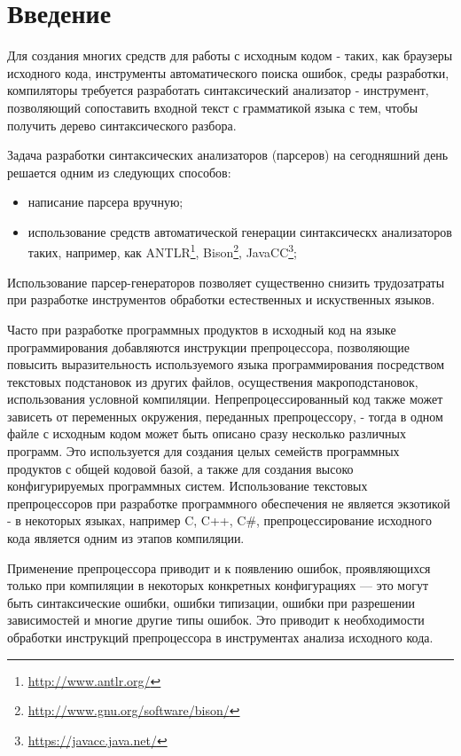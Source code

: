 \clearpage
\section{Введение}

Для создания многих средств для работы с исходным кодом - таких, как браузеры исходного кода, инструменты автоматического поиска ошибок, среды разработки, компиляторы требуется разработать синтаксический анализатор - инструмент, позволяющий сопоставить входной текст с грамматикой языка с тем, чтобы получить дерево синтаксического разбора\cite{aho}.

Задача разработки синтаксических анализаторов (парсеров) на сегодняшний день решается одним из следующих способов:
\begin{itemize}
	\item написание парсера вручную;
	\item использование средств автоматической генерации синтаксическх анализаторов таких, например, как ANTLR\footnote{\url{http://www.antlr.org/}}, Bison\footnote{\url{http://www.gnu.org/software/bison/}}, JavaCC\footnote{\url{https://javacc.java.net/}};
\end{itemize}
Использование парсер-генераторов позволяет существенно снизить трудозатраты при разработке инструментов обработки естественных и искуственных языков.

Часто при разработке программных продуктов в исходный код на языке программирования добавляются инструкции препроцессора, позволяющие повысить выразительность используемого языка программирования посредством текстовых подстановок из других файлов, осуществения макроподстановок, использования условной компиляции. Непрепроцессированный код также может зависеть от переменных окружения, переданных препроцессору, - тогда в одном файле с исходным кодом может быть описано сразу несколько различных программ. Это используется для создания целых семейств программных продуктов с общей кодовой базой\cite{flightsoftwareproductline}, а также для создания высоко конфигурируемых программных систем. Использование текстовых препроцессоров при разработке программного обеспечения не является экзотикой - в некоторых языках, например C, C++, C\#, препроцессирование исходного кода является одним из этапов компиляции.

Применение препроцессора приводит и к появлению ошибок, проявляющихся только при компиляции в некоторых конкретных конфигурациях --- это могут быть синтаксические ошибки, ошибки типизации, ошибки при разрешении зависимостей и многие другие типы ошибок. Это приводит к необходимости обработки инструкций препроцессора в инструментах анализа исходного кода.

